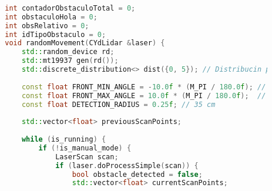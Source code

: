 \begin{lstlisting}[language={C++}, caption={Quinto ajuste de c\'odigo}, label={QuintoAjuste}]
        
        
        
        
        
        
        
        
        
        int contadorObstaculoTotal = 0;
        int obstaculoHola = 0;
        int obsRelativo = 0;
        int idTipoObstaculo = 0;
        void randomMovement(CYdLidar &laser) {
            std::random_device rd;
            std::mt19937 gen(rd());
            std::discrete_distribution<> dist({0, 5}); // Distribucin para la probabilidad de movimiento
        
            const float FRONT_MIN_ANGLE = -10.0f * (M_PI / 180.0f); // -15 grados en radaianes
            const float FRONT_MAX_ANGLE = 10.0f * (M_PI / 180.0f);  // 15 grados en radianes
            const float DETECTION_RADIUS = 0.25f; // 35 cm
        
            std::vector<float> previousScanPoints;
        
            while (is_running) {
                if (!is_manual_mode) {
                    LaserScan scan;
                    if (laser.doProcessSimple(scan)) {
                        bool obstacle_detected = false;
                        std::vector<float> currentScanPoints;
                        

\end{lstlisting}
